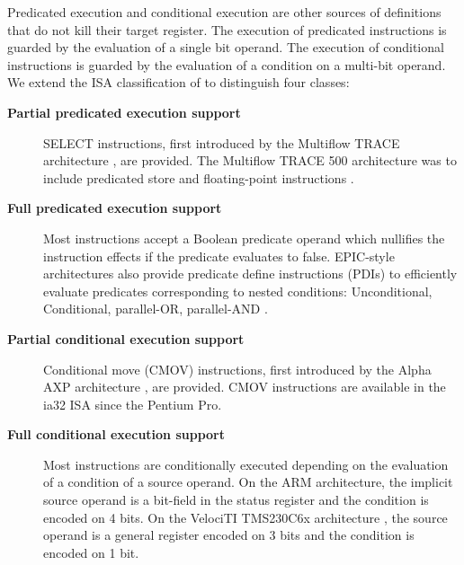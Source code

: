 Predicated execution and conditional execution are other sources of definitions
that do not kill their target register. The execution of predicated instructions
is guarded by the evaluation of a single bit operand. The execution of
conditional instructions is guarded by the evaluation of a condition on a
multi-bit operand. We extend the ISA classification of \cite{Mahlke:1995:ISCA}
to distinguish four classes: \begin{description}

\item[\bf Partial predicated execution support] SELECT instructions, first
introduced by the Multiflow TRACE architecture \cite{Colwell:1987:ASPLOS}, are
provided. The Multiflow TRACE 500 architecture was to include predicated store
and floating-point instructions \cite{Lowney:1993:JS}.

\item[\bf Full predicated execution support] Most instructions accept a Boolean
predicate operand which nullifies the instruction effects if the predicate
evaluates to false. EPIC-style architectures also provide predicate define
instructions (PDIs) to efficiently evaluate predicates corresponding to nested
conditions: Unconditional, Conditional, parallel-OR, parallel-AND
\cite{Gillies:1996:MICRO}.

\item[\bf Partial conditional execution support] Conditional move (CMOV)
instructions, first introduced by the Alpha AXP architecture
\cite{Blickstein:1992:DTJ}, are provided. CMOV instructions are available in the
ia32 ISA since the Pentium Pro.

\item[\bf Full conditional execution support] Most instructions are
conditionally executed depending on the evaluation of a condition of a source
operand. On the ARM architecture, the implicit source operand is a bit-field in
the status register and the condition is encoded on 4 bits. On the
VelociTI{\texttrademark} TMS230C6x architecture \cite{Seshan:1998:IEEESPM}, the
source operand is a general register encoded on 3 bits and the condition is
encoded on 1 bit.

\end{description}


%
%
%
%
%
%

